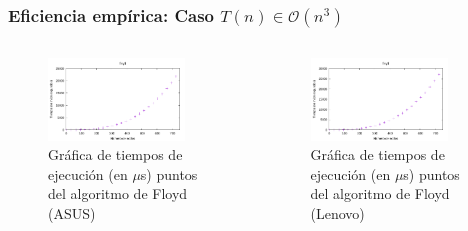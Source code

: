 \documentclass[8pt, aspectratio=169]{beamer}
\begin{document}
    \begin{frame}
        \frametitle{Eficiencia empírica: Caso $T(n) \in \mathcal{O}(n^3)$}

        \begin{columns}
            \begin{column}{0.5\textwidth}
                \begin{figure}
                    \includegraphics[width=0.85\textwidth]{../data/asus/floyd-points.pdf}
                    \caption{Gráfica de tiempos de ejecución (en $\mu$s) puntos del algoritmo de Floyd (ASUS)}
                \end{figure}
            \end{column}
            \begin{column}{0.5\textwidth}
                \begin{figure}
                    \includegraphics[width=0.85\textwidth]{../data/lenovo/floyd-points.pdf}
                    \caption{Gráfica de tiempos de ejecución (en $\mu$s) puntos del algoritmo de Floyd (Lenovo)}
                \end{figure}
            \end{column}
        \end{columns}

        
    \end{frame}
\end{document}
